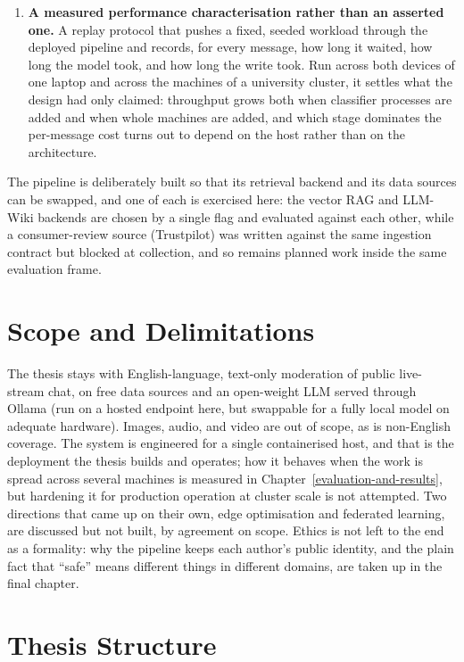 \begin{enumerate}
\item \textbf{A measured performance characterisation rather than an asserted one.} A replay protocol that pushes a fixed, seeded workload through the deployed pipeline and records, for every message, how long it waited, how long the model took, and how long the write took. Run across both devices of one laptop and across the machines of a university cluster, it settles what the design had only claimed: throughput grows both when classifier processes are added and when whole machines are added, and which stage dominates the per-message cost turns out to depend on the host rather than on the architecture.
\end{enumerate}

The pipeline is deliberately built so that its retrieval backend and its data sources can be swapped, and one of each is exercised here: the vector RAG and LLM-Wiki backends are chosen by a single flag and evaluated against each other, while a consumer-review source (Trustpilot) was written against the same ingestion contract but blocked at collection, and so remains planned work inside the same evaluation frame.

\section{Scope and Delimitations}\label{scope-and-delimitations}

The thesis stays with English-language, text-only moderation of public live-stream chat, on free data sources and an open-weight LLM served through Ollama (run on a hosted endpoint here, but swappable for a fully local model on adequate hardware). Images, audio, and video are out of scope, as is non-English coverage. The system is engineered for a single containerised host, and that is the deployment the thesis builds and operates; how it behaves when the work is spread across several machines is measured in Chapter~\ref{evaluation-and-results}, but hardening it for production operation at cluster scale is not attempted. Two directions that came up on their own, edge optimisation and federated learning, are discussed but not built, by agreement on scope. Ethics is not left to the end as a formality: why the pipeline keeps each author's public identity, and the plain fact that ``safe'' means different things in different domains, are taken up in the final chapter.

\section{Thesis Structure}\label{thesis-structure}

